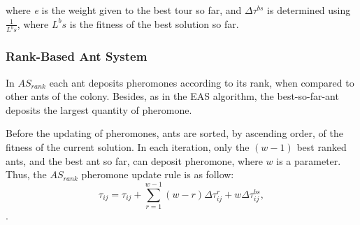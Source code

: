 		\noindent where \emph{e} is the weight given to the best tour so far, and $\Delta\tau^{bs}$ is determined using $\frac{1} {L^bs}$, where ${L^bs}$ is the fitness of the best solution so far. 

					\subsubsection*{Rank-Based Ant System}

					In $AS_{rank}$ each ant deposits pheromones according to its rank, when compared to other ants of the colony. Besides, as in the EAS algorithm, the best-so-far-ant deposits the largest quantity of pheromone.

					Before the updating of pheromones, ants are sorted, by ascending order, of the fitness of the current solution. In each iteration, only the $(w-1)$ best ranked ants, and the best ant so far, can deposit pheromone, where $w$ is a parameter. Thus, the $AS_{rank}$ pheromone update rule is as follow:
					\begin{equation}
						\label{eq:asrank_pheromone_update}
						\tau_{ij} = \tau_{ij} + \sum_{r=1}^{w-1}(w-r)\Delta\tau_{ij}^r + w\Delta\tau_{ij}^{bs},
					\end{equation}.

